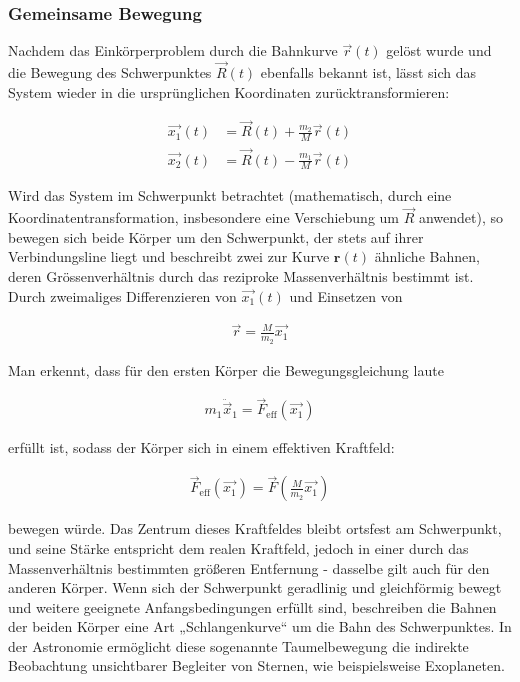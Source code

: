 \documentclass[a4paper,12pt,twoside]{article}
\begin{document}
\subsubsection{Gemeinsame Bewegung}
Nachdem das Einkörperproblem durch die Bahnkurve $\vec{r}(t)$
gelöst wurde und die Bewegung des Schwerpunktes $\vec{R}(t)$
ebenfalls bekannt ist, lässt sich das System wieder in die ursprünglichen Koordinaten zurücktransformieren:

\begin{align*}
	\vec{x_1}(t) &= \vec{R}(t) + \frac{m_2}{M} \vec{r}(t) \\
	\vec{x_2}(t) &= \vec{R}(t) - \frac{m_1}{M} \vec{r}(t)
\end{align*}

Wird das System im Schwerpunkt betrachtet (mathematisch, durch eine Koordinatentransformation, insbesondere eine Verschiebung um \( \vec{R} \) anwendet), so bewegen sich beide Körper um den Schwerpunkt, der stets auf ihrer Verbindungsline liegt und beschreibt zwei zur Kurve \( \mathbf{r}(t) \) ähnliche Bahnen, deren Grössenverhältnis durch das reziproke Massenverhältnis bestimmt ist. Durch zweimaliges Differenzieren von \( \vec{x_1}(t) \) und Einsetzen von

\begin{align*}
	\vec{r} = \frac{M}{m_2} \vec{x_1}
\end{align*}

Man erkennt, dass für den ersten Körper die Bewegungsgleichung laute

\begin{align*}
	m_1 \ddot{\vec{x}}_1 = \vec{F}_{\text{eff}}(\vec{x_1})
\end{align*}

erfüllt ist, sodass der Körper sich in einem effektiven Kraftfeld:

\begin{align*}
	\vec{F}_{\text{eff}}(\vec{x_1}) = \vec{F} \left( \frac{M}{m_2} \vec{x_1} \right)
\end{align*}

bewegen würde. Das Zentrum dieses Kraftfeldes bleibt ortsfest am Schwerpunkt, und seine Stärke entspricht dem realen Kraftfeld, jedoch in einer durch das Massenverhältnis bestimmten größeren Entfernung - dasselbe gilt auch für den anderen Körper.
Wenn sich der Schwerpunkt geradlinig und gleichförmig bewegt und weitere geeignete Anfangsbedingungen erfüllt sind, beschreiben die Bahnen der beiden Körper eine Art „Schlangenkurve“ um die Bahn des Schwerpunktes.
In der Astronomie ermöglicht diese sogenannte Taumelbewegung die indirekte Beobachtung unsichtbarer Begleiter von Sternen, wie beispielsweise Exoplaneten.
\end{document}
